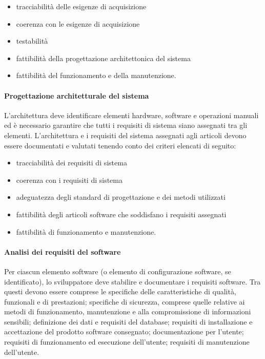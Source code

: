\documentclass[../../norme-di-progetto.tex]{subfiles}
\begin{document}
\begin{itemize}
  \item tracciabilità delle esigenze di acquisizione
  \item coerenza con le esigenze di acquisizione
  \item testabilità
  \item fattibilità della progettazione architettonica del sistema
  \item fattibilità del funzionamento e della manutenzione.
\end{itemize}


\paragraph{Progettazione architetturale del sistema}%
\label{par:progettazione_architetturale_del_sistema}

L'architettura deve identificare elementi hardware, software e operazioni manuali ed è necessario garantire che tutti i requisiti di sistema siano assegnati tra gli elementi. L'architettura e i requisiti del sistema assegnati agli articoli devono essere documentati e valutati tenendo conto dei criteri elencati di seguito:

\begin{itemize}
  \item tracciabilità dei requisiti di sistema
  \item coerenza con i requisiti di sistema
  \item adeguatezza degli standard di progettazione e dei metodi utilizzati
  \item fattibilità degli articoli software che soddisfano i requisiti assegnati
  \item fattibilità di funzionamento e manutenzione.
\end{itemize}


\paragraph{Analisi dei requisiti del software}%
\label{par:analisi_dei_requisiti_del_software}

Per ciascun elemento software (o elemento di configurazione software, se identificato), lo sviluppatore deve stabilire e documentare i requisiti software. Tra questi devono essere comprese le specifiche delle caratteristiche di qualità, funzionali e di prestazioni; specifiche di sicurezza, comprese quelle relative ai metodi di funzionamento, manutenzione e alla compromissione di informazioni sensibili; definizione dei dati e requisiti del database; requisiti di installazione e accettazione del prodotto software consegnato; documentazione per l'utente; requisiti di funzionamento ed esecuzione dell'utente; requisiti di manutenzione dell'utente.
\end{document}
